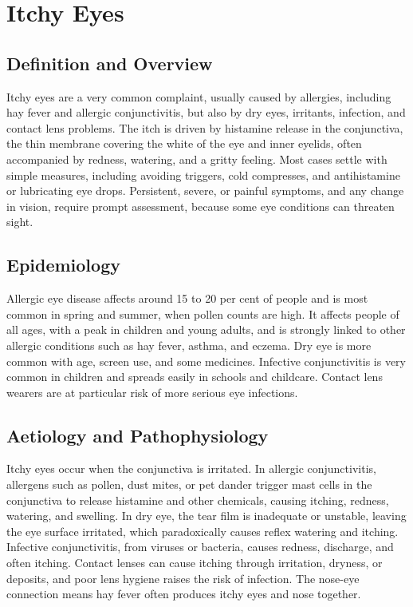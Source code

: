 \chapter{Itchy Eyes}

\section*{Definition and Overview}
Itchy eyes are a very common complaint, usually caused by allergies, including hay fever and allergic conjunctivitis, but also by dry eyes, irritants, infection, and contact lens problems. The itch is driven by histamine release in the conjunctiva, the thin membrane covering the white of the eye and inner eyelids, often accompanied by redness, watering, and a gritty feeling. Most cases settle with simple measures, including avoiding triggers, cold compresses, and antihistamine or lubricating eye drops. Persistent, severe, or painful symptoms, and any change in vision, require prompt assessment, because some eye conditions can threaten sight.

\section*{Epidemiology}
Allergic eye disease affects around 15 to 20 per cent of people and is most common in spring and summer, when pollen counts are high. It affects people of all ages, with a peak in children and young adults, and is strongly linked to other allergic conditions such as hay fever, asthma, and eczema. Dry eye is more common with age, screen use, and some medicines. Infective conjunctivitis is very common in children and spreads easily in schools and childcare. Contact lens wearers are at particular risk of more serious eye infections.

\section*{Aetiology and Pathophysiology}
Itchy eyes occur when the conjunctiva is irritated. In allergic conjunctivitis, allergens such as pollen, dust mites, or pet dander trigger mast cells in the conjunctiva to release histamine and other chemicals, causing itching, redness, watering, and swelling. In dry eye, the tear film is inadequate or unstable, leaving the eye surface irritated, which paradoxically causes reflex watering and itching. Infective conjunctivitis, from viruses or bacteria, causes redness, discharge, and often itching. Contact lenses can cause itching through irritation, dryness, or deposits, and poor lens hygiene raises the risk of infection. The nose-eye connection means hay fever often produces itchy eyes and nose together.

